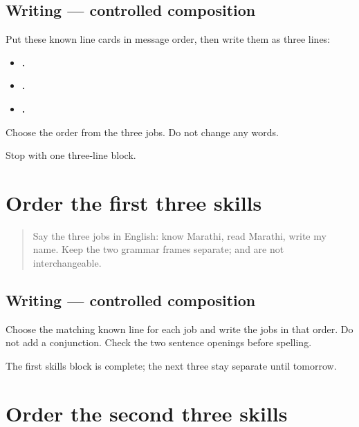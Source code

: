 \subsection*{Writing — controlled composition}
Put these known line cards in message order, then write them as three lines:

\begin{itemize}
\raggedright
  \item \textbf{  .}
  \item \textbf{ .}
  \item \textbf{   .}
\end{itemize}

Choose the order from the three jobs. Do not change any words.

\begin{tcolorbox}[breakable,colback=teal!4,colframe=teal!35!black,title={Before you move on}]
Stop with one three-line block.
\end{tcolorbox}
\section[first skills block]{Order the first three skills}

\label{lesson:MR-A1M14-skills-block-one}



\begin{quote}
Say the three jobs in English: know Marathi, read Marathi, write my name. Keep the two grammar frames separate; \textbf{} and \textbf{} are not interchangeable.
\end{quote}

\subsection*{Writing — controlled composition}
Choose the matching known line for each job and write the jobs in that order. Do not add a conjunction. Check the two sentence openings before spelling.

\begin{tcolorbox}[breakable,colback=teal!4,colframe=teal!35!black,title={Before you move on}]
The first skills block is complete; the next three stay separate until tomorrow.
\end{tcolorbox}
\section[second skills block]{Order the second three skills}

